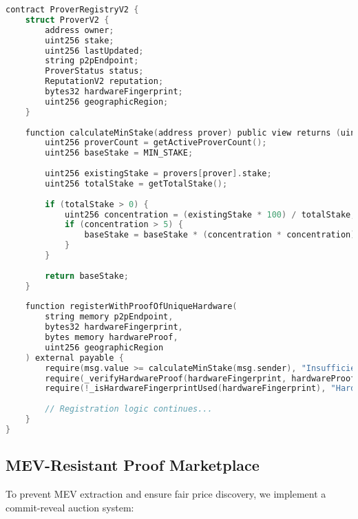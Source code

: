 \documentclass{article}
\begin{document}
\begin{lstlisting}[language=C,caption={Enhanced Prover Registry with Anti-Sybil Protection},label={lst:registry}]
contract ProverRegistryV2 {
    struct ProverV2 {
        address owner;
        uint256 stake;
        uint256 lastUpdated;
        string p2pEndpoint;
        ProverStatus status;
        ReputationV2 reputation;
        bytes32 hardwareFingerprint;
        uint256 geographicRegion;
    }
    
    function calculateMinStake(address prover) public view returns (uint256) {
        uint256 proverCount = getActiveProverCount();
        uint256 baseStake = MIN_STAKE;
        
        uint256 existingStake = provers[prover].stake;
        uint256 totalStake = getTotalStake();
        
        if (totalStake > 0) {
            uint256 concentration = (existingStake * 100) / totalStake;
            if (concentration > 5) {
                baseStake = baseStake * (concentration * concentration) / 100;
            }
        }
        
        return baseStake;
    }
    
    function registerWithProofOfUniqueHardware(
        string memory p2pEndpoint,
        bytes32 hardwareFingerprint,
        bytes memory hardwareProof,
        uint256 geographicRegion
    ) external payable {
        require(msg.value >= calculateMinStake(msg.sender), "Insufficient stake");
        require(_verifyHardwareProof(hardwareFingerprint, hardwareProof), "Invalid hardware proof");
        require(!_isHardwareFingerprintUsed(hardwareFingerprint), "Hardware already registered");
        
        // Registration logic continues...
    }
}
\end{lstlisting}

\subsection{MEV-Resistant Proof Marketplace}

To prevent MEV extraction and ensure fair price discovery, we implement a commit-reveal auction system:
\end{document}
